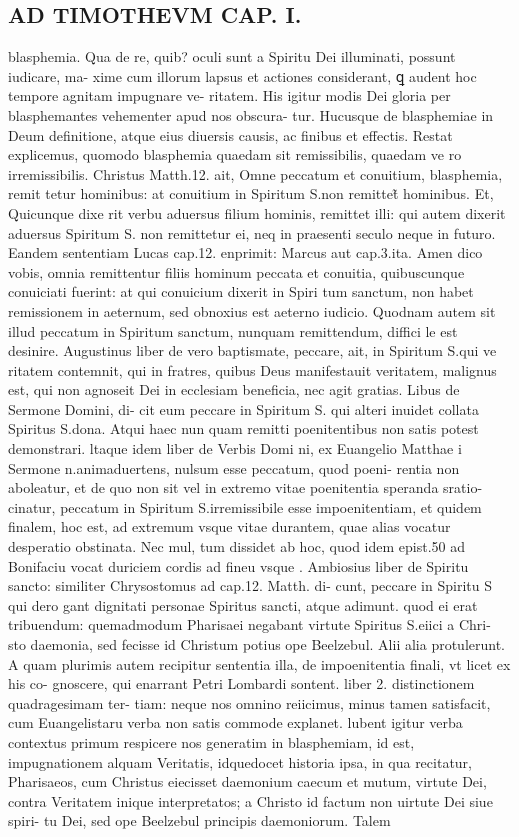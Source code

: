 \documentclass{article}
\begin{document}
\begin{pages}
\section*{AD TIMOTHEVM CAP. I. }
\marginpar{[ p.38 ]}\pstart blasphemia. Qua de re, quib? oculi sunt a Spiritu Dei illuminati, possunt iudicare, ma- xime cum illorum lapsus et actiones considerant, ꝗ audent hoc tempore agnitam impugnare ve- ritatem. His igitur modis Dei gloria per blasphemantes vehementer apud nos obscura- tur. Hucusque  de blasphemiae in Deum definitione, atque  eius diuersis causis, ac finibus et effectis. Restat explicemus, quomodo blasphemia quaedam sit remissibilis, quaedam ve ro irremissibilis. Christus Matth.12. ait, Omne peccatum et conuitium, blasphemia, remit tetur hominibus: at conuitium in Spiritum S.non remittet̃ hominibus. Et, Quicunque  dixe rit verbu aduersus filium hominis, remittet illi: qui autem dixerit aduersus Spiritum S. non remittetur ei, neq in praesenti seculo neque  in futuro. Eandem sententiam Lucas cap.12. enprimit: Marcus aut cap.3.ita. Amen dico vobis, omnia remittentur filiis hominum peccata et conuitia, quibuscunque  conuiciati fuerint: at qui conuicium dixerit in Spiri tum sanctum, non habet remissionem in aeternum, sed obnoxius est aeterno iudicio. Quodnam autem sit illud peccatum in Spiritum sanctum, nunquam remittendum, diffici le est desinire. Augustinus liber  de vero baptismate, peccare, ait, in Spiritum S.qui ve ritatem contemnit, qui in fratres, quibus Deus manifestauit veritatem, malignus est, qui non agnoseit Dei in ecclesiam beneficia, nec agit gratias. Libus de Sermone Domini, di- cit eum peccare in Spiritum S. qui alteri inuidet collata Spiritus S.dona. Atqui haec nun quam remitti poenitentibus non satis potest demonstrari. ltaque  idem liber de Verbis Domi ni, ex Euangelio Matthae i Sermone n.animaduertens, nulsum esse peccatum, quod poeni- rentia non aboleatur, et de quo non sit vel in extremo vitae poenitentia speranda sratio- cinatur, peccatum in Spiritum S.irremissibile esse impoenitentiam, et quidem finalem, hoc est, ad extremum vsque  vitae durantem, quae alias vocatur desperatio obstinata. Nec mul, tum dissidet ab hoc, quod idem epist.50 ad Bonifaciu vocat duriciem cordis ad fineu vsque . Ambiosius liber de Spiritu sancto: similiter Chrysostomus ad cap.12. Matth. di- cunt, peccare in Spiritu S qui dero gant dignitati personae Spiritus sancti, atque  adimunt. quod ei erat tribuendum: quemadmodum Pharisaei negabant virtute Spiritus S.eiici a Chri- sto daemonia, sed fecisse id Christum potius ope Beelzebul. Alii alia protulerunt. A quam plurimis autem recipitur sententia illa, de impoenitentia finali, vt licet ex his co- gnoscere, qui enarrant Petri Lombardi sontent. liber 2. distinctionem quadragesimam ter- tiam: neque  nos omnino reiicimus, minus tamen satisfacit, cum Euangelistaru verba non satis commode explanet. lubent igitur verba contextus primum respicere nos generatim in blasphemiam, id est, impugnationem alquam Veritatis, idquedocet historia ipsa, in qua recitatur, Pharisaeos, cum Christus eiecisset daemonium caecum et mutum, virtute Dei, contra Veritatem inique interpretatos; a Christo id factum non uirtute Dei siue spiri- tu Dei, sed ope Beelzebul principis daemoniorum. Talem 
\end{pages}
\end{document}
